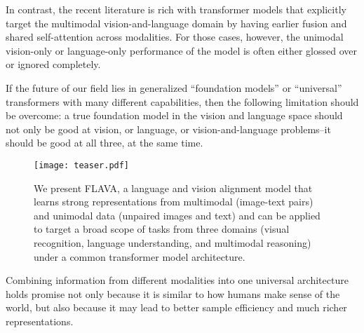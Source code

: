 \documentclass[10pt,twocolumn,letterpaper]{article}
\begin{document}
In contrast, the recent literature is rich with transformer models that explicitly target the multimodal vision-and-language domain by having earlier fusion and shared self-attention across modalities. For those cases, however, the unimodal vision-only or language-only performance of the model is often either glossed over or ignored completely.

If the future of our field lies in generalized ``foundation models'' \cite{bommasani2021opportunities} or ``universal'' transformers \cite{lu2021pretrained} with many different capabilities, then the following limitation should be overcome: a true foundation model in the vision and language space should not only be good at vision, or language, or vision-and-language problems--it should be good at all three, at the same time.

\begin{figure}[t]
\vspace{-1em}
\centering
\texttt{[image: teaser.pdf]}
\vspace{-2em}
\caption{We present FLAVA, a language and vision alignment model that learns strong representations from multimodal (image-text pairs) and unimodal data (unpaired images and text) and can be applied to target a broad scope of tasks from three domains (visual recognition, language understanding, and multimodal reasoning) under a common transformer model architecture.}
\label{fig:onecol}
\vspace{-1.5em}
\end{figure}

Combining information from different modalities into one universal architecture holds promise not only because it is similar to how humans make sense of the world, but also because it may lead to better sample efficiency and much richer representations.
\end{document}
